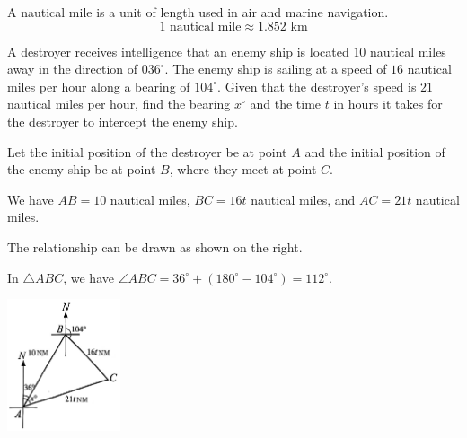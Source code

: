 \documentclass{report}
\begin{document}
   \begin{info}
    A nautical mile is a unit of length used in air and marine navigation.
    $$1 \text{ nautical mile} \approx 1.852 \text{ km}$$
    \end{info}

    \newpage
    \begin{question}
        A destroyer receives intelligence that an enemy ship is located $10$ nautical miles away in the direction of $036^\circ$. The enemy ship is sailing at a speed of $16$ nautical miles per hour along a bearing of $104^\circ$. Given that the destroyer's speed is $21$ nautical miles per hour, find the bearing $x^\circ$ and the time $t$ in hours it takes for the destroyer to intercept the enemy ship.

        \sol{}
        
        \begin{vwcol}[widths={0.7,0.3}, sep=8mm, rule=0pt,justify=flushleft]
            \noindent Let the initial position of the destroyer be at point $A$ and the initial position of the enemy ship be at point $B$, where they meet at point $C$. 
        
            \vspace{0.5em}
            \noindent We have $AB = 10$ nautical miles, $BC = 16t$ nautical miles, and $AC = 21t$ nautical miles.
            
            \vspace{0.5em}
            \noindent The relationship can be drawn as shown on the right.

            \vspace{0.5em}
            \noindent In $\triangle ABC$, we have $\angle ABC = 36^\circ + (180^\circ - 104^\circ) = 112^\circ$.
            
            \includegraphics[width=0.25\textwidth]{assets/10-67.jpg} 
        \end{vwcol}
        

\end{question}
\end{document}
